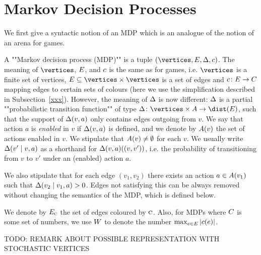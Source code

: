 \section*{Markov Decision Processes}

We first give a syntactic notion of an MDP which is an analogue of the notion of an arena for games.

\begin{definition}[""MDP""]
\label{5-def:MDP}
A ""Markov decision process (MDP)"" is a tuple $(\vertices,\edges,\probTranFunc,\colouring)$. The meaning of $\vertices$, $E$, and $c$ is the same as for games, i.e. $\vertices$ is a finite set of vertices, $\edges\subseteq \vertices\times\vertices$ is a set of edges and $c\colon E \rightarrow C$ mapping edges to certain sets of colours (here we use the simplification described in Subsection~\cref{xxx}). However, the meaning of $\Delta$ is now different: $\Delta$ is a partial ""probabilistic transition function"" of type $\probTranFunc\colon \vertices \times \actions \rightarrow \dist(\edges)$, such that the support of $\Delta(v,a)$ only contains edges outgoing from $v$. We say that action $a$ is \emph{enabled} in $v$ if $\Delta(v,a)$ is defined, and we denote by $A(v)$ the set of actions enabled in $v$. We stipulate that $A(v)\neq \emptyset$ for each $v$. We usually write $\Delta(v'\mid v,a)$ as a shorthand for $\Delta(v,a)((v,v'))$, i.e. the probability of transitioning from $v$ to $v'$ under an (enabled) action $a$.
\end{definition}

We also stipulate that for each edge $(v_1,v_2)$ there exists an action $a\in A(v_1)$ such that $\Delta(v_2\mid v_1,a)>0$. Edges not satisfying this can be always removed without changing the semantics of the MDP, which is defined below.

We denote by $E_{\textsc{c}}$ the set of edges coloured by $\textsc{c}$. Also, for MDPs where $C$ is some set of numbers, we use $W$ to denote the number $\max_{e\in 
	E}|c(e)|$.


\begin{remark}
	TODO: REMARK ABOUT POSSIBLE REPRESENTATION WITH STOCHASTIC VERTICES
\end{remark}


